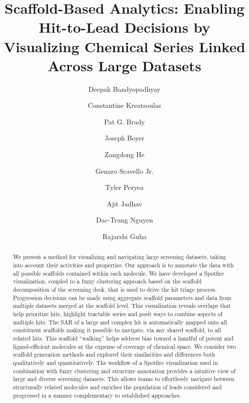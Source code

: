 \documentclass[journal=jacsat,manuscript=article]{achemso}
\author{Deepak Bandyopadhyay}
\author{Constantine Kreatsoulas}
\author{Pat G. Brady}
\author{Joseph Boyer}
\author{Zangdong He}
\author{Genaro Scavello Jr.}
\affiliation[GSK]{GlaxoSmithKline, 1250 S. Collegeville Rd, Collegeville, PA 19426}
\author{Tyler Peryea}
\author{Ajit Jadhav}
\author{Dac-Trung Nguyen}
\author{Rajarshi Guha}
\affiliation[NCATS]{National Center for Advancing Translational
  Science, 9800 Medical Center Drive, Rockville, MD 20850}
\title[Scaffold Analytics] {Scaffold-Based Analytics: Enabling Hit-to-Lead
  Decisions by Visualizing Chemical Series Linked Across Large Datasets}
\begin{document}






\begin{abstract}
  We present a method for visualizing and navigating large screening
  datasets, taking into account their activities and properties. Our
  approach is to annotate the data with all possible scaffolds
  contained within each molecule.  We have developed a Spotfire
  visualization, coupled to a fuzzy clustering approach based on the
  scaffold decomposition of the screening deck, that is used to drive
  the hit triage process. Progression decisions can be made using
  aggregate scaffold parameters and data from multiple datasets merged
  at the scaffold level.  This visualization reveals overlaps
  that help prioritize hits, highlight tractable series and posit ways
  to combine aspects of multiple hits.  The SAR of a large and complex
  hit is automatically mapped onto all constituent scaffolds making it
  possible to navigate, via any shared scaffold, to all related hits.
  This scaffold ``walking'' helps address bias toward a handful of
  potent and ligand-efficient molecules at the expense of coverage of
  chemical space.  We consider two scaffold generation methods and
  explored their similarities and differences both qualitatively and
  quantitatively.  The workflow of a Spotfire visualization used in
  combination with fuzzy clustering and structure annotation provides
  a intuitive view of large and diverse screening datasets. This
  allows teams to effortlessly navigate between structurally related
  molecules and enriches the population of leads considered and
  progressed in a manner complementary to established approaches.
\end{abstract}
\end{document}
